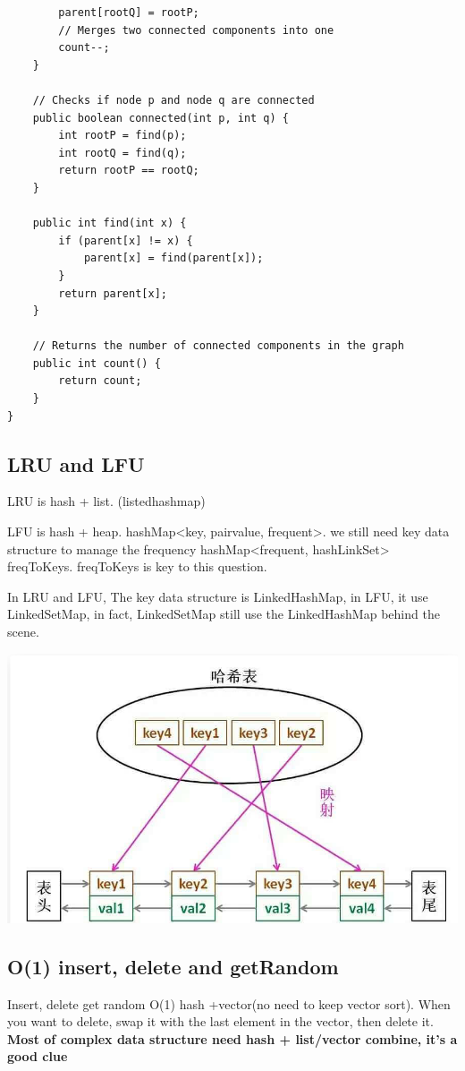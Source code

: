 \documentclass[a4paper,11pt,twoside]{book}
\begin{document}
\begin{itemize}
\begin{lstlisting}
		parent[rootQ] = rootP;
		// Merges two connected components into one
		count--;
	}
	
	// Checks if node p and node q are connected
	public boolean connected(int p, int q) {
		int rootP = find(p);
		int rootQ = find(q);
		return rootP == rootQ;
	}
	
	public int find(int x) {
		if (parent[x] != x) {
			parent[x] = find(parent[x]);
		}
		return parent[x];
	}
	
	// Returns the number of connected components in the graph
	public int count() {
		return count;
	}
}
\end{lstlisting}
		
	\end{itemize}
	
	
\subsection{LRU and LFU}

	\par  LRU is hash + list. (listedhashmap)
	\par LFU is hash + heap. hashMap<key, pair{value, frequent}>. we still need key data structure to manage the frequency hashMap<frequent, hashLinkSet> freqToKeys.  freqToKeys is key to this question. 
	
	\par In LRU and LFU, The key data structure is LinkedHashMap, in LFU, it use LinkedSetMap, in fact, LinkedSetMap still use the LinkedHashMap behind the scene. 
\begin{center}
	\includegraphics[width=0.7\linewidth]{pics/LinkedHashMap}
\end{center}
	
	
\subsection{O(1) insert, delete and getRandom}
Insert, delete get random O(1)  hash +vector(no need to keep vector sort). When you want to delete, swap it with the last element in the vector, then delete it.  \textbf{Most of complex data structure need hash + list/vector combine, it's a good clue}
	
\end{document}
